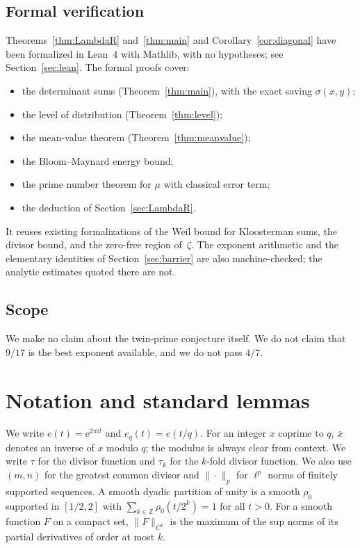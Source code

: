 \documentclass[11pt]{amsart}
\theoremstyle{definition}
\theoremstyle{remark}
\numberwithin{equation}{section}
\newcommand{\Z}{\mathbb Z}
\newcommand{\e}{\mathrm e}
\newcommand{\inv}[1]{\overline{#1}}
\begin{document}
\subsection{Formal verification}
Theorems~\ref{thm:LambdaR} and~\ref{thm:main} and
Corollary~\ref{cor:diagonal} have been formalized in Lean~4 with Mathlib,
with no hypotheses; see Section~\ref{sec:lean}.  The formal proofs cover:
\begin{itemize}
\item the determinant sums (Theorem~\ref{thm:main}), with the exact saving
$\sigma(x,y)$;
\item the level of distribution (Theorem~\ref{thm:level});
\item the mean-value theorem (Theorem~\ref{thm:meanvalue});
\item the Bloom--Maynard energy bound;
\item the prime number theorem for $\mu$ with classical error term;
\item the deduction of Section~\ref{sec:LambdaR}.
\end{itemize}
It reuses existing formalizations of the Weil bound for Kloosterman sums,
the divisor bound, and the zero-free region of~$\zeta$.  The exponent
arithmetic and the elementary identities of Section~\ref{sec:barrier} are
also machine-checked; the analytic estimates quoted there are not.

\subsection{Scope}
We make no claim about the twin-prime conjecture itself.  We do not claim
that $9/17$ is the best exponent available, and we do not pass $4/7$.

\section{Notation and standard lemmas}\label{sec:prelim}

We write $e(t)=\e^{2\pi i t}$ and $e_q(t)=e(t/q)$.  For an integer $x$
coprime to $q$, $\inv x$ denotes an inverse of $x$ modulo $q$; the modulus
is always clear from context.  We write $\tau$ for the divisor function and
$\tau_k$ for the $k$-fold divisor function.  We also use $(m,n)$ for the
greatest common divisor and $\|\cdot\|_p$ for $\ell^p$ norms of finitely
supported sequences.  A smooth dyadic partition of unity is a smooth
$\rho_0$ supported in $[1/2,2]$ with $\sum_{k\in\Z}\rho_0(t/2^k)=1$ for all
$t>0$.  For a smooth function $F$ on a compact set, $\|F\|_{C^k}$ is the
maximum of the sup norms of its partial derivatives of order at most $k$.
\end{document}
